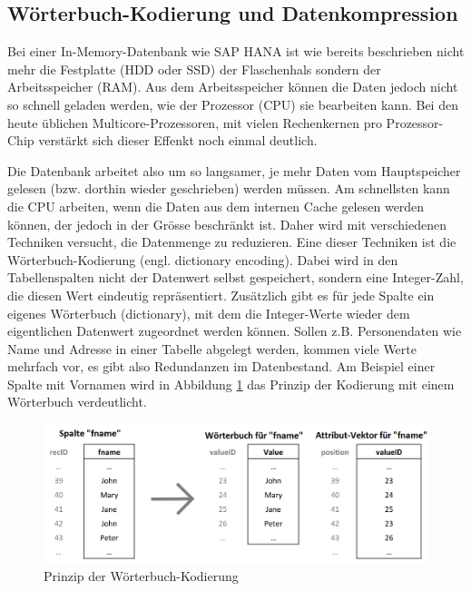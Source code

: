 \subsection{Wörterbuch-Kodierung und Datenkompression}
Bei einer In-Memory-Datenbank wie SAP HANA ist wie bereits beschrieben nicht mehr die Festplatte (HDD oder SSD) der
Flaschenhals sondern der Arbeitsspeicher (RAM). Aus dem Arbeitsspeicher können die 
Daten jedoch nicht so schnell geladen werden, wie der Prozessor (CPU) sie bearbeiten kann.
Bei den heute üblichen Multicore-Prozessoren, mit vielen Rechenkernen pro Prozessor-Chip 
verstärkt sich dieser Effenkt noch einmal deutlich.

Die Datenbank arbeitet also um so langsamer, je mehr Daten vom Hauptspeicher 
gelesen (bzw. dorthin wieder geschrieben) werden müssen.
Am schnellsten kann die CPU arbeiten, wenn die Daten aus dem internen Cache gelesen
werden können, der jedoch in der Grösse beschränkt ist.
Daher wird mit verschiedenen Techniken versucht, die Datenmenge zu reduzieren.
Eine dieser Techniken ist die Wörterbuch-Kodierung (engl. dictionary encoding).
Dabei wird in den Tabellenspalten nicht der Datenwert selbst gespeichert, sondern eine
Integer-Zahl, die diesen Wert eindeutig repräsentiert. Zusätzlich gibt es für jede Spalte 
ein eigenes Wörterbuch (dictionary), mit dem die Integer-Werte wieder dem 
eigentlichen Datenwert zugeordnet werden können. 
Sollen z.B. Personendaten wie 
Name und Adresse in einer Tabelle abgelegt werden, kommen viele Werte mehrfach vor, 
es gibt also Redundanzen im Datenbestand.
Am Beispiel einer Spalte mit Vornamen wird in Abbildung \ref{dictenc} das Prinzip der Kodierung mit einem Wörterbuch verdeutlicht.

\begin{figure}[h]
\centering
\includegraphics[width=.9\textwidth]{img/dict-enc.png}
\caption[Prinzip der Wörterbuch-Kodierung]{Prinzip der Wörterbuch-Kodierung\footnotemark}
\label{dictenc}
\end{figure}

